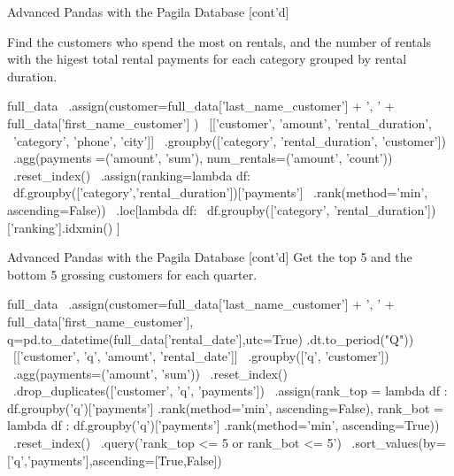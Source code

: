 \documentclass[ignorenonframetext,xcolor=x11names]{beamer}
\begin{document}
\begin{frame}[label=full,fragile]{Advanced Pandas with the Pagila Database \small [cont'd]}

Find the customers who spend the most on rentals, and the number of rentals with the higest total rental payments for each category grouped by rental duration.

\scriptsize
\begin{pythoncode}
full_data \
   .assign(customer=full_data['last_name_customer'] + ', ' + 
                    full_data['first_name_customer'] ) \
   [['customer', 'amount', 'rental_duration', \
     'category', 'phone', 'city']] \
   .groupby(['category', 'rental_duration', 'customer']) \
   .agg(payments =('amount', 'sum'), 
        num_rentals=('amount', 'count')) \
   .reset_index() \
   .assign(ranking=lambda df: \
      df.groupby(['category','rental_duration'])['payments'] \
        .rank(method='min', ascending=False)) \
    .loc[lambda df:  \
         df.groupby(['category', 'rental_duration'])
            ['ranking'].idxmin() ]
\end{pythoncode}
\end{frame}

\begin{frame}[label=full,fragile]{Advanced Pandas with the Pagila Database \small [cont'd]}
Get the top 5 and the bottom 5 grossing customers for each quarter.

\footnotesize
\begin{pythoncode}
full_data \
   .assign(customer=full_data['last_name_customer'] + ', ' + 
                    full_data['first_name_customer'],
           q=pd.to_datetime(full_data['rental_date'],utc=True)
                 .dt.to_period("Q"))  \
   [['customer', 'q', 'amount', 'rental_date']] \
   .groupby(['q', 'customer']) \
   .agg(payments=('amount', 'sum')) \
   .reset_index() \
   .drop_duplicates(['customer', 'q', 'payments']) \
   .assign(rank_top = lambda df : 
              df.groupby('q')['payments']
                .rank(method='min', ascending=False),
           rank_bot = lambda df : 
              df.groupby('q')['payments']
              .rank(method='min', ascending=True)) \
    .reset_index() \
    .query('rank_top <= 5 or rank_bot <= 5') \
    .sort_values(by=['q','payments'],ascending=[True,False]) 

\end{pythoncode}
\end{frame}
\end{document}
